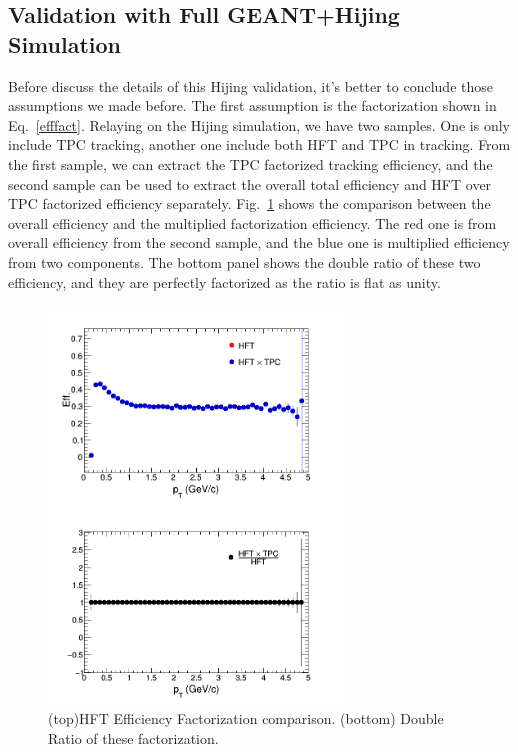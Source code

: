 \subsection{Validation with Full GEANT+Hijing Simulation}

Before discuss the details of this Hijing validation, it's better to conclude those assumptions we made before. The first assumption is the factorization shown in Eq.~\ref{efffact}. Relaying on the Hijing simulation, we have two samples. One is only include TPC tracking, another one include both HFT and TPC in tracking. From the first sample, we can extract the TPC factorized tracking efficiency, and the second sample can be used to extract the overall total efficiency and HFT over TPC factorized efficiency separately. Fig.~\ref{assumption01} shows the comparison between the overall efficiency and the multiplied factorization efficiency. The red one is from overall efficiency from the second sample, and the blue one is multiplied efficiency from two components. The bottom panel shows the double ratio of these two efficiency, and they are perfectly factorized as the ratio is flat as unity.

\begin{figure}[htbp]
\centering
\includegraphics[keepaspectratio,width=0.7\textwidth]{figure/Run14_D0HFT/assumption01.png}
\caption{(top)HFT Efficiency Factorization comparison. (bottom) Double Ratio of these factorization.}
\label{assumption01}
\end{figure}

